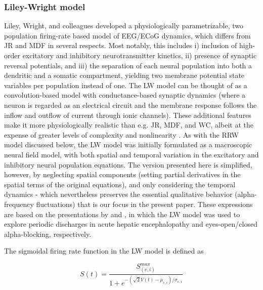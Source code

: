 \documentclass[12pt,twoside]{article}
\begin{document}
\subsubsection{Liley-Wright model}

Liley, Wright, and colleagues \citep{liley2001spatially} developed a physiologically parametrizable, two population firing-rate based model of EEG/ECoG dynamics, which differs from JR and MDF in several respects. Most notably, this includes i) inclusion of high-order excitatory and inhibitory neurotransmitter kinetics, ii) presence of synaptic reversal potentials, and iii) the separation of each neural population into both a dendritic and a somatic compartment, yielding two membrane potential state variables per population instead of one. The LW model can be thought of as a convolution-based model with conductance-based synaptic dynamics (where a neuron is regarded as an electrical circuit and the membrane response follows the inflow and outflow of current through ionic channels). These additional features make it more physiologically realistic than e.g. JR, MDF, and WC, albeit at the expense of greater levels of complexity and nonlinearity \citep{cook2021neural}. As with the RRW model discussed below, the LW model was initially formulated as a macroscopic neural field model, with both spatial and temporal variation in the excitatory and inhibitory neural population equations. The version presented here is simplified, however, by neglecting spatial components (setting partial derivatives in the spatial terms of the original equations), and only considering the temporal dynamics - which nevertheless preserves the essential qualitative behavior (alpha-frequency fluctuations) that is our focus in the present paper. These expressions are based on the presentations by \citet{song2019novel} and \citet{hartoyo2019parameter}, in which the LW model was used to explore periodic discharges in acute hepatic encephalopathy and eyes-open/closed alpha-blocking, respectively. 

The sigmoidal firing rate function in the LW model is defined as

\begin{equation}
   S(t)=\frac{S_{(e,i)}^{max}}{1+e^{-(\sqrt{2} V(t)-\mu_{e,i} )/\sigma_{e,i}}}
\end{equation}
\end{document}
